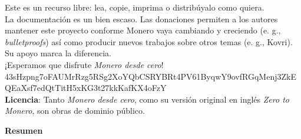 \documentclass[usletter,11pt,english,oneside,onecolumn,final,openany]{report}
\begin{document}
\begin{center}
  \begin{minipage}[t]{6.43in}
Este es un recurso libre: lea, copie, imprima o distribúyalo como quiera.\\

La documentación es un bien escaso. Las donaciones permiten a los autores mantener este proyecto conforme Monero vaya cambiando y creciendo (e. g., \textit{bulletproofs}) así como producir nuevos trabajos sobre otros temas (e. g., Kovri). Su apoyo marca la diferencia.\\

¡Esperamos que disfrute \textit{Monero desde cero}!\vspace{.33cm}\\
\newlength\stextwidth
\settowidth{\stextwidth}
{\footnotesize{43sHzpng7oFAUMrRzg5RSg2XoYQbCSRYBRt4PV61ByqwY9ovfRGqMenj3ZkEQEaXsf7edQtTitH5xKG3t27kkKafKX4oFzY}}
\vspace{-.45cm}
\makebox[\textwidth][c]{\rule{\stextwidth}{.4pt}}\vspace{-.15cm}
\vspace{-.35cm}
\makebox[\textwidth][c]{\rule{\stextwidth}{.4pt}}
\vspace{.117cm}\\
\textbf{Licencia}: Tanto \textit{Monero desde cero}, como su versión original en inglés \textit{Zero to Monero}, son obras de dominio público.
  
  \end{minipage}
\end{center}
\vspace{0cm}

\newpage
\pagestyle{empty}
\begin{center}
\vspace*{\fill}%
{\LARGE \bfseries  Resumen}
\end{center}
\vspace{0.5cm}
\begin{center} 
\begin{minipage}{5.5in}
\begin{center} \vrule width 4.5in height 0.4pt \end{center} 
\parindent=0pt 

\begin{center} \vrule width 4.5in height 0.4pt \end{center} 
\end{minipage} 
\vspace*{\fill}
\end{center}
\end{document}
